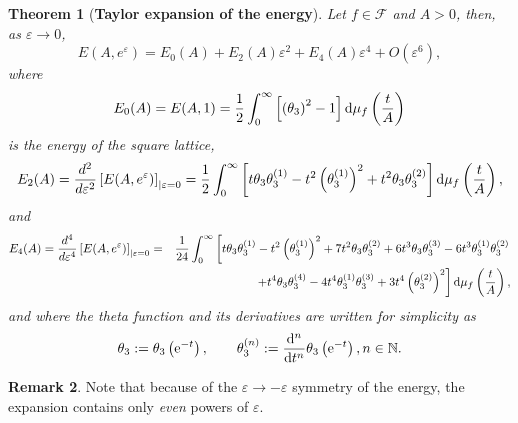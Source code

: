 \documentclass[12pt]{interact}
\newtheorem{thm}{Theorem}[section]
\theoremstyle{definition}
\newtheorem{remark}[thm]{Remark}
\newcommand{\N}{\mathbb N}
\begin{document}
\begin{thm}[\textbf{Taylor expansion of the energy}]
Let $f\in \mathcal{F}$ and $A>0$, then, as $\varepsilon\to 0$,
\begin{equation} \label{ecreps}
E(A,e^\varepsilon) = E_0(A) + E_2(A) \varepsilon^2 + E_4(A) \varepsilon^4
+ O(\varepsilon^6) ,
\end{equation}
where 
\begin{equation} 
E_0(A) = E(A,1)= \frac{1}{2} \int_0^\infty 
\left[ \left( \theta_3 \right)^2 - 1 \right]{\rm d}\mu_f\left(\frac{t}{A} \right)
\end{equation}
is the energy of the square lattice,
\begin{equation} \label{E2A} 
E_2(A) =\frac{d^2}{d\varepsilon^2}\left[ E(A,e^\varepsilon)\right]_{|\varepsilon=0}
= \frac{1}{2} \int_0^\infty \left[ t \theta_3 \theta_3^{(1)}
- t^2 \left( \theta_3^{(1)} \right)^2 + t^2 \theta_3 \theta_3^{(2)} \right]
{\rm d}\mu_f\left(\frac{t}{A} \right) ,
\end{equation}
and 
\begin{eqnarray} 
E_4(A)  = \frac{d^4}{d\varepsilon^4}\left[ E(A,e^\varepsilon)\right]_{|\varepsilon=0}
& = & \frac{1}{24} \int_0^\infty 
\left[ t \theta_3 \theta_3^{(1)} - t^2 \left( \theta_3^{(1)} \right)^2
+ 7 t^2 \theta_3 \theta_3^{(2)} + 6 t^3 \theta_3 \theta_3^{(3)}
-6 t^3 \theta_3^{(1)} \theta_3^{(2)}\right. \nonumber \\ & & \left.
 + t^4 \theta_3 \theta_3^{(4)}
- 4 t^4 \theta_3^{(1)} \theta_3^{(3)} + 3 t^4 \left( \theta_3^{(2)} \right)^2
\right]{\rm d}\mu_f\left(\frac{t}{A} \right),
\end{eqnarray}
and where the theta function and its derivatives are written for simplicity as
\begin{equation}
\theta_3 := \theta_3\left({\rm e}^{-t}\right) , \qquad
\theta_3^{(n)} := \frac{{\rm d}^n}{{\rm d}t^n}
\theta_3\left({\rm e}^{-t}\right), n\in \N.
\end{equation} 
\end{thm}
\begin{remark}
Note that because of the $\varepsilon\to -\varepsilon$ symmetry of the energy,
the expansion contains only {\em even} powers of $\varepsilon$.
\end{remark}
\end{document}
